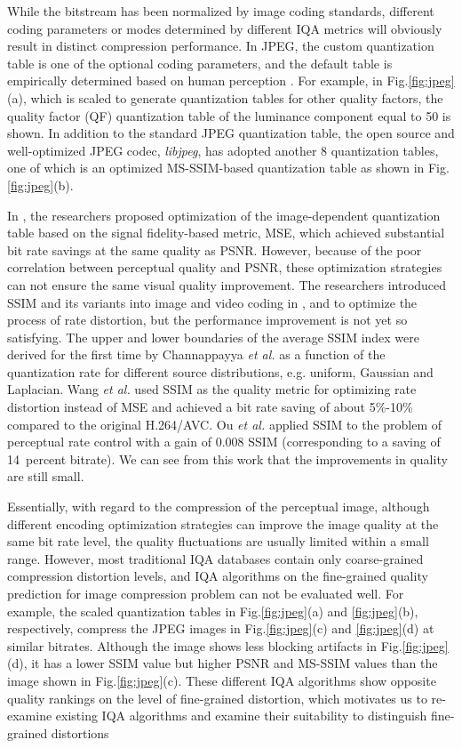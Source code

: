 While the bitstream has been normalized by image coding standards, different coding parameters or modes determined by different IQA metrics will obviously result in distinct compression performance. In JPEG, the custom quantization table is one of the optional coding parameters, and the default table is empirically determined based on human perception \cite{Wallace1992}. For example, in Fig.\ref{fig:jpeg}(a), which is scaled to generate quantization tables for other quality factors, the quality factor (QF) quantization table of the luminance component equal to 50 is shown. In addition to the standard JPEG quantization table, the open source and well-optimized JPEG codec, \emph{libjpeg}, has adopted another 8 quantization tables, one of which is an optimized MS-SSIM-based quantization table as shown in Fig.\ref{fig:jpeg}(b). 

In \cite{Ratnakar2000}, the researchers proposed optimization of the image-dependent quantization table based on the signal fidelity-based metric, MSE, which achieved substantial bit rate savings at the same quality as PSNR. However, because of the poor correlation between perceptual quality and PSNR, these optimization strategies can not ensure the same visual quality improvement. The researchers introduced SSIM and its variants into image and video coding in \cite{Channappayya2008}, \cite{Wang2012} and \cite{Ou2011} to optimize the process of rate distortion, but the performance improvement is not yet so satisfying. The upper and lower boundaries of the average SSIM index were derived for the first time by Channappayya \emph{et al.}\cite{Channappayya2008} as a function of the quantization rate for different source distributions, e.g. uniform, Gaussian and Laplacian. Wang \emph{et al.}\cite{Wang2012} used SSIM as the quality metric for optimizing rate distortion instead of MSE and achieved a bit rate saving of about 5\%-10\% compared to the original H.264/AVC. Ou \emph{et al.} \cite{Ou2011} applied SSIM to the problem of perceptual rate control with a gain of 0.008 SSIM (corresponding to a saving of 14\ percent bitrate). We can see from this work that the improvements in quality are still small. 

Essentially, with regard to the compression of the perceptual image, although different encoding optimization strategies can improve the image quality at the same bit rate level, the quality fluctuations are usually limited within a small range. However, most traditional IQA databases contain only coarse-grained compression distortion levels, and IQA algorithms on the fine-grained quality prediction for image compression problem can not be evaluated well. For example, the scaled quantization tables in Fig.\ref{fig:jpeg}(a) and \ref{fig:jpeg}(b), respectively, compress the JPEG images in Fig.\ref{fig:jpeg}(c) and \ref{fig:jpeg}(d) at similar bitrates. Although the image shows less blocking artifacts in Fig.\ref{fig:jpeg}(d), it has a lower SSIM value but higher PSNR and MS-SSIM values than the image shown in Fig.\ref{fig:jpeg}(c). These different IQA algorithms show opposite quality rankings on the level of fine-grained distortion, which motivates us to re-examine existing IQA algorithms and examine their suitability to distinguish fine-grained distortions 


